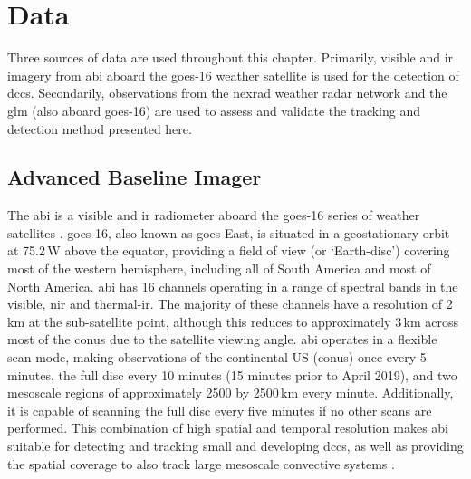 \section{Data}

Three sources of data are used throughout this chapter.
Primarily, visible and \acrshort{ir} imagery from \acrshort{abi} aboard the \acrshort{goes}-16 weather satellite is used for the detection of \acrshort{dcc}s.
Secondarily, observations from the \acrshort{nexrad} weather radar network and the \acrshort{glm} (also aboard \acrshort{goes}-16) are used to assess and validate the tracking and detection method presented here.


\subsection{Advanced Baseline Imager} \label{sec:abi_data}


The \acrshort{abi} is a visible and \acrshort{ir} radiometer aboard the \acrshort{goes}-16 series of weather satellites \citep{schmit_closer_2016}.
\acrshort{goes}-16, also known as \acrshort{goes}-East, is situated in a geostationary orbit at 75.2\,\textdegree W above the equator, providing a field of view (or `Earth-disc') covering most of the western hemisphere, including all of South America and most of North America.
\acrshort{abi} has 16 channels operating in a range of spectral bands in the visible, \acrshort{nir} and thermal-\acrshort{ir}.
The majority of these channels have a resolution of 2\,\unit{km} at the sub-satellite point, although this reduces to approximately 3\,\unit{km} across most of the \acrfull{conus} due to the satellite viewing angle.
\acrshort{abi} operates in a flexible scan mode, making observations of the continental US (\acrshort{conus}) once every 5 minutes, the full disc every 10 minutes (15 minutes prior to April 2019), and two mesoscale regions of approximately 2500 by 2500\,\unit{km} every minute.
Additionally, it is capable of scanning the full disc every five minutes if no other scans are performed.
This combination of high spatial and temporal resolution makes \acrshort{abi} suitable for detecting and tracking small and developing \acrshort{dcc}s, as well as providing the spatial coverage to also track large mesoscale convective systems \citep{heikenfeld_tobac_2019}.


